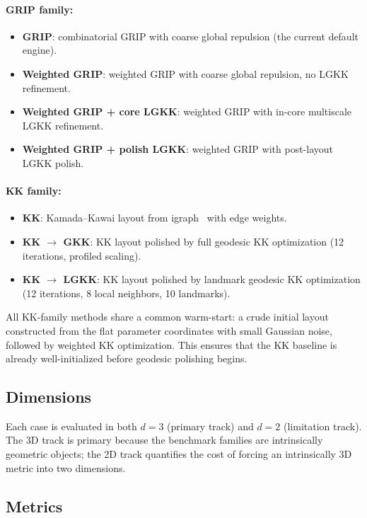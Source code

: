 \documentclass[11pt,twocolumn]{article}
\begin{document}
\paragraph{GRIP family:}
\begin{itemize}
\item \textbf{GRIP}: combinatorial GRIP with coarse global repulsion
  (the current default engine).
\item \textbf{Weighted GRIP}: weighted GRIP with coarse global repulsion,
  no LGKK refinement.
\item \textbf{Weighted GRIP + core LGKK}: weighted GRIP with in-core
  multiscale LGKK refinement.
\item \textbf{Weighted GRIP + polish LGKK}: weighted GRIP with
  post-layout LGKK polish.
\end{itemize}

\paragraph{KK family:}
\begin{itemize}
\item \textbf{KK}: Kamada--Kawai layout from igraph~\citep{csardi2006}
  with edge weights.
\item \textbf{KK $\to$ GKK}: KK layout polished by full geodesic KK
  optimization (12 iterations, profiled scaling).
\item \textbf{KK $\to$ LGKK}: KK layout polished by landmark geodesic
  KK optimization (12 iterations, 8 local neighbors, 10 landmarks).
\end{itemize}

All KK-family methods share a common warm-start: a crude initial layout
constructed from the flat parameter coordinates with small Gaussian noise,
followed by weighted KK optimization.  This ensures that the KK baseline
is already well-initialized before geodesic polishing begins.

\subsection{Dimensions}

Each case is evaluated in both $d = 3$ (primary track) and $d = 2$
(limitation track).  The 3D track is primary because the benchmark
families are intrinsically geometric objects; the 2D track quantifies the
cost of forcing an intrinsically 3D metric into two dimensions.

\subsection{Metrics}\label{sec:metrics}
\end{document}
